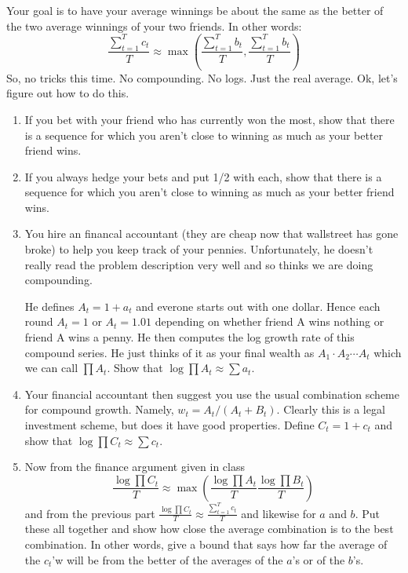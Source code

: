 \documentclass[12pt]{extarticle}
\begin{document}
Your goal is to have your average winnings be about the same as the
better of the two average winnings of your two friends.  In other words:
\begin{displaymath}
\frac{\sum_{t=1}^T c_t}{T} \approx \max(\frac{\sum_{t=1}^T b_t}{T},\frac{\sum_{t=1}^T b_t}{T})
\end{displaymath}
So, no tricks this time.  No compounding.  No logs.  Just the real
average.  Ok, let's figure out how to do this.
\begin{enumerate}
\item If you bet with your friend who has currently won the most, show
that there is a sequence for which you aren't close to winning as much
as your better friend wins.
\item If you always hedge your bets and put 1/2 with each, show that
there is a sequence for which you aren't close to winning as much
as your better friend wins.
\item You hire an financal accountant (they are cheap now that
 wallstreet has gone broke) to help you keep track of your pennies.
  Unfortunately, he doesn't really read the problem description very
 well and so thinks we are doing compounding.  

 He defines $A_t = 1 + a_t$ and everone starts out with one dollar.
  Hence each round $A_t = 1$ or $A_t = 1.01$ depending on whether
 friend A wins nothing or friend A wins a penny.  He then computes the
 log growth rate of this compound series.  He just thinks of it as
 your final wealth as $A_1 \cdot A_2 \cdots A_t$ which we can call
 $\prod A_t$.  Show that $\log \prod A_t \approx \sum a_t$.
\item Your financial accountant then suggest you use the usual
 combination scheme for compound growth.  Namely, $w_t =
 A_t/(A_t+B_t)$.  Clearly this is a legal investment scheme, but does
 it have good properties.  Define $C_t = 1 + c_t$ and show that $\log
 \prod C_t \approx \sum c_t$.
\item Now from the finance argument given in class
\begin{displaymath}
\frac{\log \prod C_t}{T} \approx \max(
\frac{\log \prod A_t}{T}
\frac{\log \prod B_t}{T})
\end{displaymath}
and from the previous part $\frac{\log \prod C_t}{T} \approx
\frac{\sum_{t=1}^T c_t}{T}$ and likewise for $a$ and $b$.  Put these
all together and show how close the average combination is to the best
combination.  In other words, give a bound that says how far the average
of the $c_t$'w will be from the better of the averages of the $a$'s or
of the $b$'s.
\end{enumerate}
\end{document}
